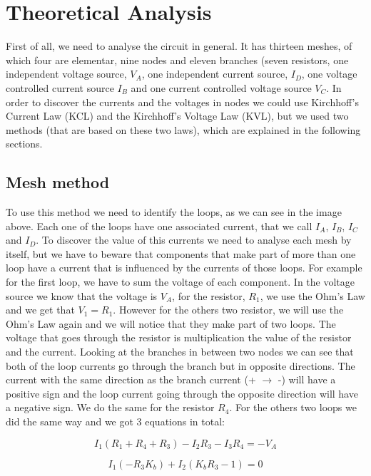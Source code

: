 \section{Theoretical Analysis}
\label{sec:analysis}

\par First of all, we need to analyse the circuit in general. It has thirteen meshes, of which four are elementar, nine nodes and eleven branches (seven resistors, one independent voltage source, $V_A$, one independent current source, $I_D$, one voltage controlled current source $I_B$ and one current controlled voltage source $V_C$. In order to discover the currents and the voltages in nodes we could use Kirchhoff's Current Law (KCL) and the Kirchhoff's Voltage Law (KVL), but we used two methods (that are based on these two laws), which are explained in the following sections.

\subsection{Mesh method}
\label{mesh method}

To use this method we need to identify the loops, as we can see in the image above. Each one of the loops have one associated current, that we call $I_A$, $I_B$, $I_C$ and $I_D$. To discover the value of this currents we need to analyse each mesh by itself, but we have to beware that components that make part of more than one loop have a current that is influenced by the currents of those loops. For example for the first loop, we have to sum the voltage of each component. In the voltage source we know that the voltage is $V_A$, for the resistor, $R_1$, we use the Ohm's Law and we get that $V_1 = R_1$. However for the others two resistor, we will use the Ohm's Law again and we will notice that they make part of two loops. The voltage that goes through the resistor is multiplication the value of the resistor and the current. Looking at the branches in between two nodes we can see that both of the loop currents go through the branch but in opposite directions. The current with the same direction as the branch current (+ $\rightarrow$ -) will have a positive sign and the loop current going through the opposite direction will have a negative sign. We do the same for the resistor $R_4$. For the others two loops we did the same way and we got 3 equations in total:
 
\begin{center}
    \begin{equation}
       I_1(R_1+ R_4 + R_3)-I_2 R_3-I_3 R_4=-V_A 
      \end{equation}
\end{center}
\begin{center}
    \begin{equation}
          I_1(-R_3 K_b)+I_2(K_b R_3-1)=0 
    \end{equation}
\end{center}

